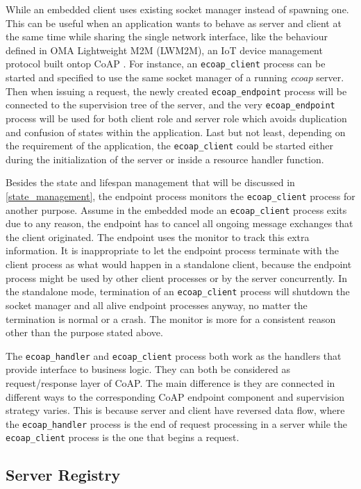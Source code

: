 While an embedded client uses existing socket manager instead of spawning one. This can be useful when an application wants to behave as server and client at the same time while sharing the single network interface, like the behaviour defined in OMA Lightweight M2M (LWM2M), an IoT device management protocol built ontop CoAP \cite{}. For instance, an \verb|ecoap_client| process can be started and specified to use the same socket manager of a running \textit{ecoap} server. Then when issuing a request, the newly created \verb|ecoap_endpoint| process will be connected to the supervision tree of the server, and the very \verb|ecoap_endpoint| process will be used for both client role and server role which avoids duplication and confusion of states within the application. Last but not least, depending on the requirement of the application, the \verb|ecoap_client| could be started either during the initialization of the server or inside a resource handler function.

Besides the state and lifespan management that will be discussed in \ref{state_management}, the endpoint process monitors the \verb|ecoap_client| process for another purpose. Assume in the embedded mode an \verb|ecoap_client| process exits due to any reason, the endpoint has to cancel all ongoing message exchanges that the client originated. The endpoint uses the monitor to track this extra information. It is inappropriate to let the endpoint process terminate with the client process as what would happen in a standalone client, because the endpoint process might be used by other client processes or by the server concurrently. In the standalone mode, termination of an \verb|ecoap_client| process will shutdown the socket manager and all alive endpoint processes anyway, no matter the termination is normal or a crash. The monitor is more for a consistent reason other than the purpose stated above.

The \verb|ecoap_handler| and \verb|ecoap_client| process both work as the handlers that provide interface to business logic. They can both be considered as request/response layer of CoAP. The main difference is they are connected in different ways to the corresponding CoAP endpoint component and supervision strategy varies. This is because server and client have reversed data flow, where the \verb|ecoap_handler| process is the end of request processing in a server while the \verb|ecoap_client| process is the one that begins a request.

\subsection{Server Registry}\label{coap_registry}

